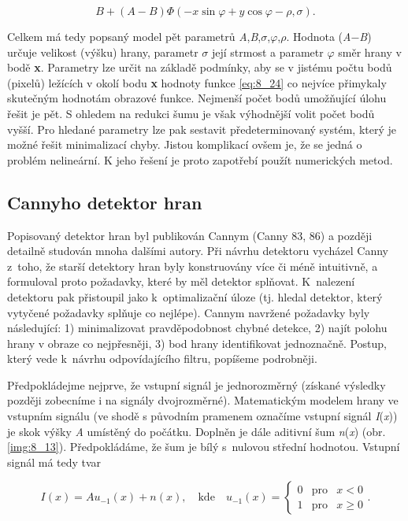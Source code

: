 \begin{equation} \label{eq:8_24}
    B + (A - B) \Phi( - x \sin \varphi + y \cos \varphi - \rho, \sigma).
\end{equation}

Celkem má tedy popsaný model pět parametrů \textit{A},\textit{B},$\sigma$,$\varphi$,$\rho$. Hodnota (\textit{A}$-$\textit{B}) určuje velikost (výšku) hrany, parametr $\sigma$ její strmost a parametr $\varphi$ směr hrany v bodě \textbf{x}. Parametry lze určit na základě podmínky, aby se v jistému počtu bodů (pixelů) ležících v okolí bodu \textbf{x} hodnoty funkce \eqref{eq:8_24} co nejvíce přimykaly skutečným hodnotám obrazové funkce. Nejmenší počet bodů umožňující úlohu řešit je pět. S ohledem na redukci šumu je však výhodnější volit počet bodů vyšší. Pro hledané parametry lze pak sestavit předeterminovaný systém, který je možné řešit minimalizací chyby. Jistou komplikací ovšem je, že se jedná o problém nelineární. K jeho řešení je proto zapotřebí použít numerických metod.

\subsection*{Cannyho detektor hran}

Popisovaný detektor hran byl publikován Cannym (Canny 83, 86) a později detailně studován mnoha dalšími autory. Při návrhu detektoru vycházel Canny z~toho, že starší detektory hran byly konstruovány více či méně intuitivně, a formuloval proto požadavky, které by měl detektor splňovat. K~nalezení detektoru pak přistoupil jako k~optimalizační úloze (tj. hledal detektor, který vytyčené požadavky splňuje co nejlépe). Cannym navržené požadavky byly následující: 1) minimalizovat pravděpodobnost chybné detekce, 2) najít polohu hrany v obraze co nejpřesněji, 3) bod hrany identifikovat jednoznačně. Postup, který vede k~návrhu odpovídajícího filtru, popíšeme podrobněji.

Předpokládejme nejprve, že vstupní signál je jednorozměrný (získané výsledky později zobecníme i na signály dvojrozměrné). Matematickým modelem hrany ve vstupním signálu (ve shodě s původním pramenem označíme vstupní signál \textit{I}(\textit{x})) je skok výšky \textit{A} umístěný do počátku. Doplněn je dále aditivní šum \textit{n}(\textit{x}) (obr. \ref{img:8_13}). Předpokládáme, že šum je bílý s~nulovou střední hodnotou. Vstupní signál má tedy tvar

\begin{equation} \label{eq:8_25}
    I(x) = Au_{-1}(x) + n(x), \quad \mathrm{kde} \quad u_{-1}(x) = \left\{ \begin{array}{ccc}
    0 & \mathrm{pro} & x < 0 \\
    1 & \mathrm{pro} & x \geq 0
    \end{array}\right. .
\end{equation}

